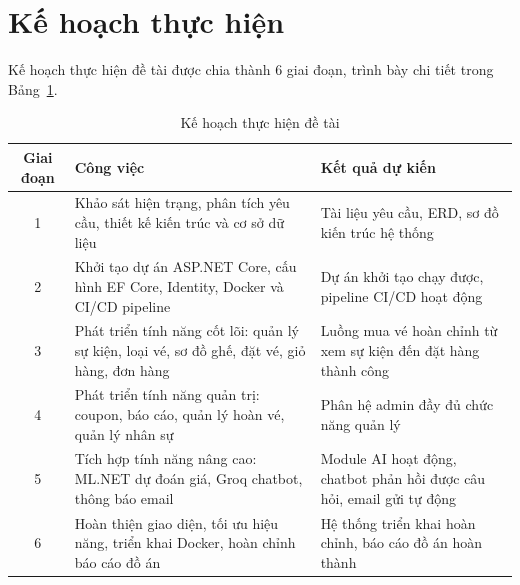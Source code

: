 \documentclass[../main.tex]{subfiles}
\begin{document}
\section{Kế hoạch thực hiện}

Kế hoạch thực hiện đề tài được chia thành 6 giai đoạn, trình bày chi tiết trong Bảng~\ref{tab:ke-hoach}.

\begin{table}[H]
\centering
\caption{Kế hoạch thực hiện đề tài}
\label{tab:ke-hoach}
\begin{tabular}{|c|p{5.5cm}|p{5.5cm}|}
\hline
\textbf{Giai đoạn} & \textbf{Công việc} & \textbf{Kết quả dự kiến} \\
\hline
1 & Khảo sát hiện trạng, phân tích yêu cầu, thiết kế kiến trúc và cơ sở dữ liệu & Tài liệu yêu cầu, ERD, sơ đồ kiến trúc hệ thống \\
\hline
2 & Khởi tạo dự án ASP.NET Core, cấu hình EF Core, Identity, Docker và CI/CD pipeline & Dự án khởi tạo chạy được, pipeline CI/CD hoạt động \\
\hline
3 & Phát triển tính năng cốt lõi: quản lý sự kiện, loại vé, sơ đồ ghế, đặt vé, giỏ hàng, đơn hàng & Luồng mua vé hoàn chỉnh từ xem sự kiện đến đặt hàng thành công \\
\hline
4 & Phát triển tính năng quản trị: coupon, báo cáo, quản lý hoàn vé, quản lý nhân sự & Phân hệ admin đầy đủ chức năng quản lý \\
\hline
5 & Tích hợp tính năng nâng cao: ML.NET dự đoán giá, Groq chatbot, thông báo email & Module AI hoạt động, chatbot phản hồi được câu hỏi, email gửi tự động \\
\hline
6 & Hoàn thiện giao diện, tối ưu hiệu năng, triển khai Docker, hoàn chỉnh báo cáo đồ án & Hệ thống triển khai hoàn chỉnh, báo cáo đồ án hoàn thành \\
\hline
\end{tabular}
\end{table}
\end{document}
